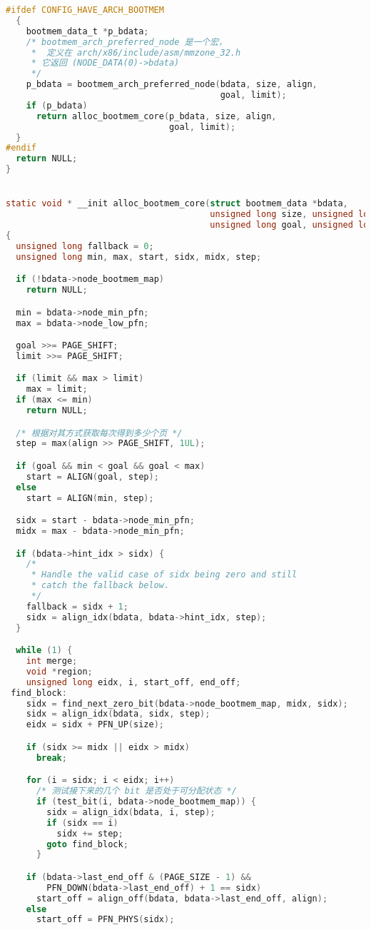 \documentclass[b5paper,9pt,twoside,openany]{article}
\begin{document}
\begin{lstlisting}[language=C]
#ifdef CONFIG_HAVE_ARCH_BOOTMEM
  {
    bootmem_data_t *p_bdata;
    /* bootmem_arch_preferred_node 是一个宏，
     *  定义在 arch/x86/include/asm/mmzone_32.h 
     * 它返回 (NODE_DATA(0)->bdata) 
     */
    p_bdata = bootmem_arch_preferred_node(bdata, size, align,
                                          goal, limit);
    if (p_bdata)
      return alloc_bootmem_core(p_bdata, size, align,
                                goal, limit);
  }
#endif
  return NULL;
}


static void * __init alloc_bootmem_core(struct bootmem_data *bdata,
                                        unsigned long size, unsigned long align,
                                        unsigned long goal, unsigned long limit)
{
  unsigned long fallback = 0;
  unsigned long min, max, start, sidx, midx, step;

  if (!bdata->node_bootmem_map)
    return NULL;

  min = bdata->node_min_pfn;
  max = bdata->node_low_pfn;

  goal >>= PAGE_SHIFT;
  limit >>= PAGE_SHIFT;

  if (limit && max > limit)
    max = limit;
  if (max <= min)
    return NULL;

  /* 根据对其方式获取每次得到多少个页 */
  step = max(align >> PAGE_SHIFT, 1UL);

  if (goal && min < goal && goal < max)
    start = ALIGN(goal, step);
  else
    start = ALIGN(min, step);

  sidx = start - bdata->node_min_pfn;
  midx = max - bdata->node_min_pfn;

  if (bdata->hint_idx > sidx) {
    /*
     * Handle the valid case of sidx being zero and still
     * catch the fallback below.
     */
    fallback = sidx + 1;
    sidx = align_idx(bdata, bdata->hint_idx, step);
  }

  while (1) {
    int merge;
    void *region;
    unsigned long eidx, i, start_off, end_off;
 find_block:
    sidx = find_next_zero_bit(bdata->node_bootmem_map, midx, sidx);
    sidx = align_idx(bdata, sidx, step);
    eidx = sidx + PFN_UP(size);

    if (sidx >= midx || eidx > midx)
      break;

    for (i = sidx; i < eidx; i++)
      /* 测试接下来的几个 bit 是否处于可分配状态 */
      if (test_bit(i, bdata->node_bootmem_map)) {
        sidx = align_idx(bdata, i, step);
        if (sidx == i)
          sidx += step;
        goto find_block;
      }

    if (bdata->last_end_off & (PAGE_SIZE - 1) &&
        PFN_DOWN(bdata->last_end_off) + 1 == sidx)
      start_off = align_off(bdata, bdata->last_end_off, align);
    else
      start_off = PFN_PHYS(sidx);


\end{lstlisting}
\end{document}
